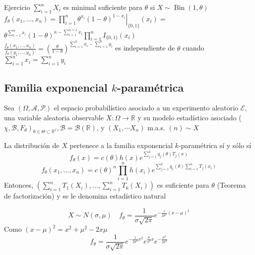   Ejercicio $\sum_{i=1}^{n} X_{i}$ es minimal suficiente para $\theta$ si $X \sim \operatorname{Bin}(1, \theta)$\\
  $f_{\theta}\left(x_{1}, \ldots, x_{n}\right)=\left.\prod_{i=1}^{n} \theta^{x_{i}}(1-\theta)^{1-x_{i}}\right|_{\{0,1\}}\left(x_{i}\right)=$\\
  $\theta^{\sum_{i=1}^{n} x_{i}}(1-\theta)^{n-\sum_{i=1}^{n=1} x_{i}} \prod_{i=1}^{n} I_{\{0,1\}}\left(x_{i}\right)$\\
  $\frac{f_{\theta}\left(x_{1}, \ldots, x_{n}\right)}{f_{\theta}\left(y_{1}, \ldots, y_{n}\right)}=\left(\frac{\theta}{1-\theta}\right)^{\sum_{i=1}^{n} x_{i}-\sum_{i=1}^{n} y_{i}}$ es independiente de $\theta$ cuando\\
  $\sum_{i=1}^{n} x_{i}=\sum_{i=1}^{n} y_{i}$
  
  \subsection*{Familia exponencial $k$-paramétrica}
  
  \begin{definición}
  Sea $(\Omega, \mathcal{A}, \mathcal{P})$ el espacio probabilístico asociado a un experimento aleatorio $\mathcal{E}$, una variable aleatoria observable $X: \Omega \longrightarrow \mathbb{R}$ y su modelo estadístico asociado ( $\left.\chi, \mathcal{B}, F_{\theta}\right)_{\theta \in \Theta \subset \mathbb{R}^{\ell}}, \mathcal{B}=\mathcal{B}(\mathbb{R})$, y $\left(X_{1}, \cdots X_{n}\right)$ m.a.s. $(n) \sim X$
  
  La distribución de $X$ pertenece a la familia exponencial $k$-paramétrica sí y sólo sí
  \[f_{\theta}(x)=c(\theta) h(x) e^{\sum_{j=1}^{k} q_{j}(\theta) T_{j}(x)}\]
  \[f_{\theta}\left(x_{1}, \ldots, x_{n}\right)=c(\theta)^{n} \prod_{i=1}^{n} h\left(x_{i}\right) e^{\sum_{j=1}^{k} q_{j}(\theta) \sum_{i=1}^{n} T_{j}\left(x_{i}\right)}\]
  Entonces, $\left(\sum_{i=1}^{n} T_{1}\left(X_{i}\right), \ldots, \sum_{i=1}^{n} T_{k}\left(X_{i}\right)\right)$ es suficiente para $\theta$ (Teorema de factorización) y se le denomina estadístico natural
  \end{definición}
  
  \[X \sim N(\sigma, \mu) \quad f_\theta = \frac{1}{\sigma \sqrt{2\pi}}e^{-\frac{1}{2\sigma^2}(x - \mu)^2}\]
  Como $(x- \mu)^2 = x^2 + \mu^2 -2x\mu$\\
  \[f_\theta = \frac{1}{\sigma \sqrt{2\pi}}e^{-\frac{1}{2\sigma^2}x^2}e^{\frac{\mu}{\sigma^2}x}e^{-\frac{\mu^2}{2\sigma^2}}\]
  
